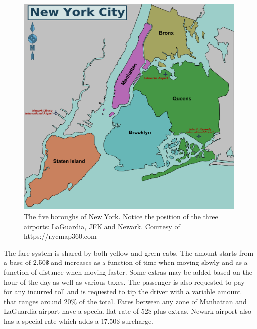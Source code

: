 \documentclass{acm_proc_article-sp-sigmod09}
\begin{document}
\begin{figure}
	\centering
	\includegraphics[width=1\columnwidth]{resources/nyc_borough_map.png}
	\caption{The five boroughs of New York. Notice the position of the three airports: LaGuardia, JFK and Newark. Courtesy of https://nycmap360.com}
	\label{fig:boroughsMap}
\end{figure}

The fare system is shared by both yellow and green cabs. The amount starts from a base of 2.50\$ and increases as a function of time when moving slowly and as a function of distance when moving faster. Some extras may be added based on the hour of the day as well as various taxes. The passenger is also requested to pay for any incurred toll and is requested to tip the driver with a variable amount that ranges around 20\% of the total. Fares between any zone of Manhattan and LaGuardia airport have a special flat rate of 52\$ plus extras. Newark airport also has a special rate which adds a 17.50\$ surcharge.
\end{document}
